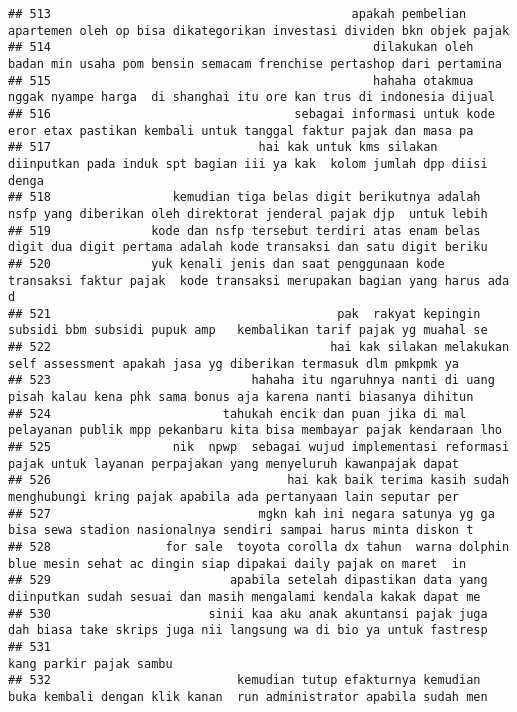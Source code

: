 \documentclass[
]{article}
\begin{document}
\begin{verbatim}
## 513                                          apakah pembelian apartemen oleh op bisa dikategorikan investasi dividen bkn objek pajak
## 514                                             dilakukan oleh badan min usaha pom bensin semacam frenchise pertashop dari pertamina
## 515                                             hahaha otakmua nggak nyampe harga  di shanghai itu ore kan trus di indonesia dijual 
## 516                                  sebagai informasi untuk kode eror etax pastikan kembali untuk tanggal faktur pajak dan masa pa 
## 517                             hai kak untuk kms silakan diinputkan pada induk spt bagian iii ya kak  kolom jumlah dpp diisi denga 
## 518                 kemudian tiga belas digit berikutnya adalah nsfp yang diberikan oleh direktorat jenderal pajak djp  untuk lebih 
## 519              kode dan nsfp tersebut terdiri atas enam belas digit dua digit pertama adalah kode transaksi dan satu digit beriku 
## 520              yuk kenali jenis dan saat penggunaan kode transaksi faktur pajak  kode transaksi merupakan bagian yang harus ada d 
## 521                                        pak  rakyat kepingin subsidi bbm subsidi pupuk amp   kembalikan tarif pajak yg muahal se 
## 522                                       hai kak silakan melakukan self assessment apakah jasa yg diberikan termasuk dlm pmkpmk ya 
## 523                            hahaha itu ngaruhnya nanti di uang pisah kalau kena phk sama bonus aja karena nanti biasanya dihitun 
## 524                        tahukah encik dan puan jika di mal pelayanan publik mpp pekanbaru kita bisa membayar pajak kendaraan lho 
## 525                 nik  npwp  sebagai wujud implementasi reformasi pajak untuk layanan perpajakan yang menyeluruh kawanpajak dapat 
## 526                                 hai kak baik terima kasih sudah menghubungi kring pajak apabila ada pertanyaan lain seputar per 
## 527                             mgkn kah ini negara satunya yg ga bisa sewa stadion nasionalnya sendiri sampai harus minta diskon t 
## 528                for sale  toyota corolla dx tahun  warna dolphin blue mesin sehat ac dingin siap dipakai daily pajak on maret  in
## 529                         apabila setelah dipastikan data yang diinputkan sudah sesuai dan masih mengalami kendala kakak dapat me 
## 530                      sinii kaa aku anak akuntansi pajak juga dah biasa take skrips juga nii langsung wa di bio ya untuk fastresp
## 531                                                                                                          kang parkir pajak sambu
## 532                          kemudian tutup efakturnya kemudian buka kembali dengan klik kanan  run administrator apabila sudah men 

\end{verbatim}
\end{document}
